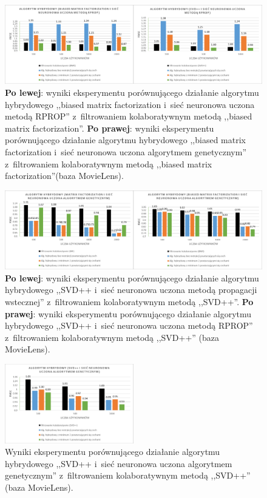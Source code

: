 \documentclass[twoside]{iisthesis}
\begin{document}
		\begin{figure}
			\centering
			\includegraphics[width=1\textwidth]{ml_exphybrid2_3}			
			\caption{\textbf{Po lewej}: wyniki eksperymentu porównującego działanie algorytmu hybrydowego ,,biased matrix factorization i~sieć neuronowa uczona metodą RPROP'' z~filtrowaniem kolaboratywnym metodą ,,biased matrix factorization''. \textbf{Po prawej}: wyniki eksperymentu porównującego działanie algorytmu hybrydowego ,,biased matrix factorization i~sieć neuronowa uczona algorytmem genetycznym'' z~filtrowaniem kolaboratywnym metodą ,,biased matrix factorization''(baza MovieLens).}
			\label{fig:ml_exphybrid2_3}
		\end{figure}
		
		\begin{figure}
			\centering
			\includegraphics[width=1\textwidth]{ml_exphybrid2_4}			
			\caption{\textbf{Po lewej}: wyniki eksperymentu porównującego działanie algorytmu hybrydowego ,,SVD++ i~sieć neuronowa uczona metodą propagacji wstecznej'' z~filtrowaniem kolaboratywnym metodą ,,SVD++''. \textbf{Po prawej}: wyniki eksperymentu porównującego działanie algorytmu hybrydowego ,,SVD++ i~sieć neuronowa uczona metodą RPROP'' z~filtrowaniem kolaboratywnym metodą ,,SVD++'' (baza MovieLens).}
			\label{fig:ml_exphybrid2_4}
		\end{figure}
		
		\begin{figure}
			\centering
			\includegraphics[width=0.5\textwidth]{ml_exphybrid2_5}			
			\caption{Wyniki eksperymentu porównującego działanie algorytmu hybrydowego ,,SVD++ i~sieć neuronowa uczona algorytmem genetycznym'' z~filtrowaniem kolaboratywnym metodą ,,SVD++'' (baza MovieLens).}
			\label{fig:ml_exphybrid2_5}
		\end{figure}
	
\end{document}
